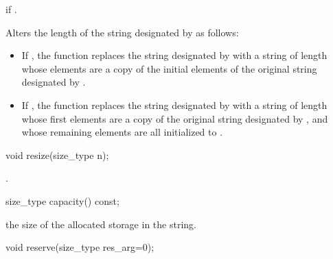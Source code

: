 \begin{itemdescr}
\pnum
\requires
{}

\pnum
\throws
{}
if
.

\pnum
\effects
Alters the length of the string designated by
as follows:

\begin{itemize}
\item
If
,
the function replaces the string designated by
with a string of length  whose elements are a
copy of the initial elements of the original string designated by
.
\item
If
,
the function replaces the string designated by
with a string of length  whose first
elements are a copy of the original string designated by
,
and whose remaining elements are all initialized to .
\end{itemize}
\end{itemdescr}

%
%
\begin{itemdecl}
void resize(size_type n);
\end{itemdecl}

\begin{itemdescr}
\pnum
\effects
{}.
\end{itemdescr}

%
%
\begin{itemdecl}
size_type capacity() const;
\end{itemdecl}

\begin{itemdescr}
\pnum
\returns
the size of the allocated storage in the string.
\end{itemdescr}

%
%
\begin{itemdecl}
void reserve(size_type res_arg=0);
\end{itemdecl}

